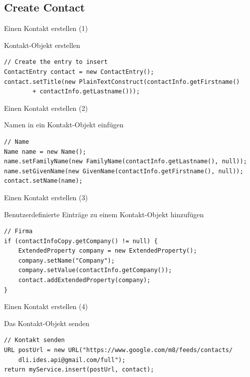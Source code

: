 \subsection*{Create Contact}

\begin{frame}[fragile]{Einen Kontakt erstellen (1)}
\begin{block}{Kontakt-Objekt erstellen}
\javalstset
\begin{lstlisting}
// Create the entry to insert
ContactEntry contact = new ContactEntry();
contact.setTitle(new PlainTextConstruct(contactInfo.getFirstname()
		+ contactInfo.getLastname()));
\end{lstlisting}
\end{block}
\end{frame}

\begin{frame}[fragile]{Einen Kontakt erstellen (2)}
\begin{block}{Namen in ein Kontakt-Objekt einfügen}
\javalstset
\begin{lstlisting}
// Name
Name name = new Name();
name.setFamilyName(new FamilyName(contactInfo.getLastname(), null));
name.setGivenName(new GivenName(contactInfo.getFirstname(), null));
contact.setName(name);
\end{lstlisting}
\end{block}
\end{frame}

\begin{frame}[fragile]{Einen Kontakt erstellen (3)}
\begin{block}{Benutzerdefinierte Einträge zu einem Kontakt-Objekt hinzufügen}
\javalstset
\begin{lstlisting}
// Firma
if (contactInfoCopy.getCompany() != null) {
	ExtendedProperty company = new ExtendedProperty();
	company.setName("Company");
	company.setValue(contactInfo.getCompany());
	contact.addExtendedProperty(company);
}
\end{lstlisting}
\end{block}
\end{frame}

\begin{frame}[fragile]{Einen Kontakt erstellen (4)}
\begin{block}{Das Kontakt-Objekt senden}
\javalstset
\begin{lstlisting}
// Kontakt senden		
URL postUrl = new URL("https://www.google.com/m8/feeds/contacts/
	dli.ides.api@gmail.com/full");
return myService.insert(postUrl, contact);
\end{lstlisting}
\end{block}
\end{frame}


